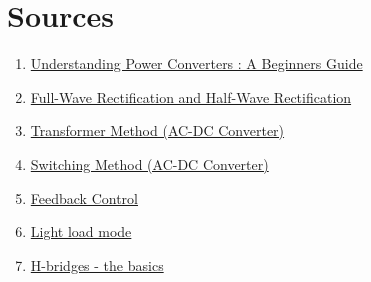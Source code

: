 \section{Sources}
\begin{enumerate}
    \item \href{https://www.quarktwin.com/blogs/converter/understanding-power-converters-a-beginners-guide/459}{Understanding Power Converters : A Beginners Guide}
    \item \href{https://www.rohm.com/electronics-basics/ac-dc/rectification}{Full-Wave Rectification and Half-Wave Rectification}
    \item \href{https://www.rohm.com/electronics-basics/ac-dc/transformer-method}{Transformer Method (AC-DC Converter)}
    \item \href{https://www.rohm.com/electronics-basics/ac-dc/switching-method}{Switching Method (AC-DC Converter)}
    \item \href{https://www.rohm.com/electronics-basics/ac-dc/feedback-control}{Feedback Control}
    \item \href{https://www.rohm.com/electronics-basics/ac-dc/light-load-mode}{Light load mode}
    \item \href{https://www.modularcircuits.com/blog/articles/h-bridge-secrets/h-bridges-the-basics/}{H-bridges - the basics}
\end{enumerate}